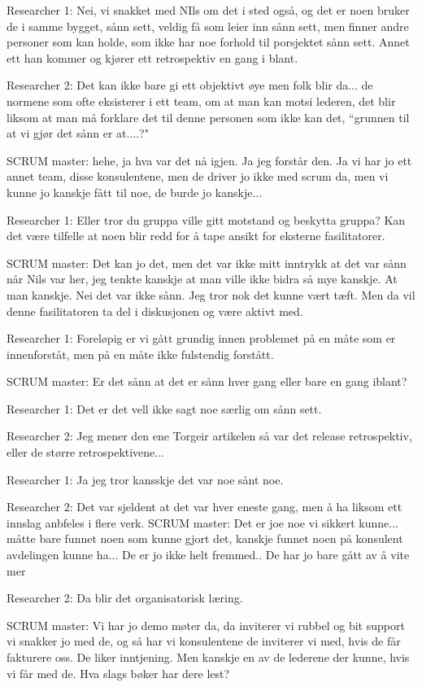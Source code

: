 Researcher 1: Nei, vi snakket med NIls om det i sted også, og det er noen bruker de i samme bygget, sånn sett, veldig få som leier inn sånn sett, men finner andre personer som kan holde, som ikke har noe forhold til porsjektet sånn sett. Annet ett han kommer og kjører ett retrospektiv en gang i blant.

Researcher 2: Det kan ikke bare gi ett objektivt øye men folk blir da... de normene som ofte eksisterer i ett team, om at man kan motsi lederen, det blir liksom at man må forklare det til denne personen som ikke kan det, ``grunnen til at vi gjør det sånn er at....?"

SCRUM master: hehe, ja hva var det nå igjen. Ja jeg forstår den. Ja vi har jo ett annet team, disse konsulentene, men de driver jo ikke med scrum da, men vi kunne jo kanskje fått til noe, de burde jo kanskje...

Researcher 1: Eller tror du gruppa ville gitt motstand og beskytta gruppa? Kan det være tilfelle at noen blir redd for å tape ansikt for eksterne fasilitatorer.

SCRUM master: Det kan jo det, men det var ikke mitt inntrykk at det var sånn når Nils var her, jeg tenkte kanskje at man ville ikke bidra så mye kanskje. At man kanskje. Nei det var ikke sånn. Jeg tror nok det kunne vært tæft. Men da vil denne fasilitatoren ta del i diskusjonen og være aktivt med. 

Researcher 1: Foreløpig er vi gått grundig innen problemet på en måte som er innenforståt, men på en måte ikke fulstendig forstått.

SCRUM master: Er det sånn at det er sånn hver gang eller bare en gang iblant?

Researcher 1: Det er det vell ikke sagt noe særlig om sånn sett.

Researcher 2: Jeg mener den ene Torgeir artikelen så var det release retrospektiv, eller de større retrospektivene...

Researcher 1: Ja jeg tror kansskje det var noe sånt noe.

Researcher 2: Det var sjeldent at det var hver eneste gang, men å ha liksom ett innslag anbfeles i flere verk.
SCRUM master: Det er joe noe vi sikkert kunne... måtte bare funnet noen som kunne gjort det, kanskje funnet noen på konsulent avdelingen kunne ha... De er jo ikke helt fremmed.. De har jo bare gått av å vite mer

Researcher 2: Da blir det organisatorisk læring.

SCRUM master: Vi har jo demo møter da, da inviterer vi rubbel og bit support vi snakker jo med de, og så har vi konsulentene de inviterer vi med, hvis de får fakturere oss. De liker inntjening. Men kanskje en av de lederene der kunne, hvis vi får med de. Hva slags bøker har dere lest?

